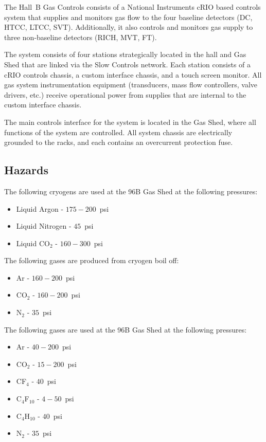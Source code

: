 The Hall~B Gas Controls consists of a National Instruments cRIO based controls system 
that supplies and monitors gas flow to the four baseline detectors (DC, HTCC, 
LTCC, SVT). Additionally, it also controls and monitors gas supply to three non-baseline 
detectors (RICH, MVT, FT). 

The system consists of four stations strategically located in the hall and Gas Shed that 
are linked via the Slow Controls network. Each station consists of a cRIO controls chassis, 
a custom interface chassis, and a touch screen monitor. All gas system instrumentation 
equipment (transducers, mass flow controllers, valve drivers, etc.) receive operational 
power from supplies that are internal to the custom interface chassis. 

The main controls interface for the system is located in the Gas Shed, where all functions 
of the system are controlled. All system chassis are electrically grounded to the racks, 
and each contains an overcurrent protection fuse. 

\subsection{Hazards} 

The following cryogens are used at the 96B Gas Shed at the following pressures:
\begin{itemize}
\item Liquid Argon - $175 - 200$~psi
\item Liquid Nitrogen - $45$~psi
\item Liquid CO$_2$ - $160 - 300$~psi
\end{itemize}

The following gases are produced from cryogen boil off:

\begin{itemize}
\item Ar - $160 - 200$~psi
\item CO$_2$ - $160 - 200$~psi
\item N$_2$ - $35$~psi
\end{itemize}

The following gases are used at the 96B Gas Shed at the following pressures:

\begin{itemize}
\item Ar - $40 - 200$~psi
\item CO$_2$ - $15-200$~psi
\item CF$_4$ - $40$~psi
\item C$_4$F$_{10}$ - $4 - 50$~psi
\item C$_4$H$_{10}$ - $40$~psi
\item N$_2$ - $35$~psi
\end{itemize}

